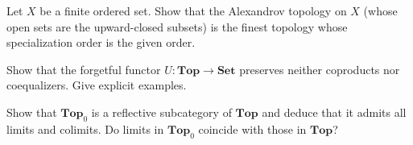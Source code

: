 \begin{exercise}
Let $X$ be a finite ordered set. Show that the Alexandrov topology on $X$ (whose open sets
are the upward-closed subsets) is the finest topology whose specialization order is the
given order.
\end{exercise}

\begin{exercise}
Show that the forgetful functor $U\colon \mathbf{Top} \to \mathbf{Set}$ preserves neither
coproducts nor coequalizers. Give explicit examples.
\end{exercise}

\begin{exercise}
Show that $\mathbf{Top}_0$ is a reflective subcategory of $\mathbf{Top}$ and deduce that
it admits all limits and colimits. Do limits in $\mathbf{Top}_0$ coincide with those in
$\mathbf{Top}$?
\end{exercise}
